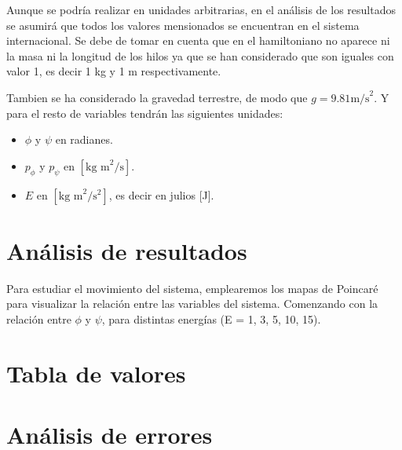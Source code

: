\documentclass[11pt, twoside]{article} %
\begin{document}
Aunque se podría realizar en unidades arbitrarias, en el análisis 
de los resultados se asumirá que todos los valores mensionados se 
encuentran en el sistema internacional. Se debe de tomar en cuenta que 
en el hamiltoniano no aparece ni la masa ni la longitud de los hilos 
ya que se han considerado que son iguales con valor 1, es decir 1 kg y 
1 m respectivamente. 

Tambien se ha considerado la gravedad terrestre, de modo que 
$g = 9.81 \text{m/s}^2$. Y para el resto de variables tendrán las 
siguientes unidades:

\begin{itemize}
    \item $\phi$ y $\psi$ en radianes.
    \item $p_\phi$ y $p_\psi$ en $[\text{kg m}^2/\text{s}]$.
    \item $E$ en $[\text{kg m}^2/\text{s}^2]$, es decir en julios [J].
\end{itemize}

\section{Análisis de resultados}

Para estudiar el movimiento del sistema, emplearemos los mapas de 
Poincaré para visualizar la relación entre las variables del sistema. 
Comenzando con la relación entre $\phi$ y $\psi$, para distintas 
energías (E = 1, 3, 5, 10, 15). 




\newpage

\appendix

\section{Tabla de valores}


\newpage

\section{Análisis de errores}
\end{document}
